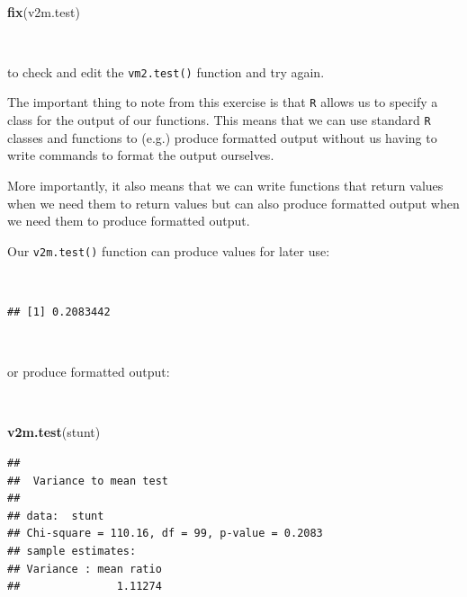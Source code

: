 \documentclass[12pt,a4paper]{book}
\newenvironment{Shaded}{\begin{snugshade}}{\end{snugshade}}
\newcommand{\KeywordTok}[1]{\textcolor[rgb]{0.13,0.29,0.53}{\textbf{#1}}}
\newcommand{\NormalTok}[1]{#1}
\newcommand{\OperatorTok}[1]{\textcolor[rgb]{0.81,0.36,0.00}{\textbf{#1}}}
\newcommand{\StringTok}[1]{\textcolor[rgb]{0.31,0.60,0.02}{#1}}
\theoremstyle{definition}
\theoremstyle{definition}
\theoremstyle{definition}
\theoremstyle{remark}
\begin{document}
~

\begin{Shaded}
\begin{Highlighting}[]
\KeywordTok{fix}\NormalTok{(v2m.test)}
\end{Highlighting}
\end{Shaded}

~

to check and edit the \texttt{vm2.test()} function and try again.

The important thing to note from this exercise is that \texttt{R} allows
us to specify a class for the output of our functions. This means that
we can use standard \texttt{R} classes and functions to (e.g.) produce
formatted output without us having to write commands to format the
output ourselves.

More importantly, it also means that we can write functions that return
values when we need them to return values but can also produce formatted
output when we need them to produce formatted output.

Our \texttt{v2m.test()} function can produce values for later use:

~

\begin{Shaded}
\end{Shaded}

\begin{verbatim}
## [1] 0.2083442
\end{verbatim}

~

or produce formatted output:

~

\begin{Shaded}
\begin{Highlighting}[]
\KeywordTok{v2m.test}\NormalTok{(stunt)}
\end{Highlighting}
\end{Shaded}

\begin{verbatim}
## 
##  Variance to mean test
## 
## data:  stunt
## Chi-square = 110.16, df = 99, p-value = 0.2083
## sample estimates:
## Variance : mean ratio 
##               1.11274
\end{verbatim}

~
\end{document}
